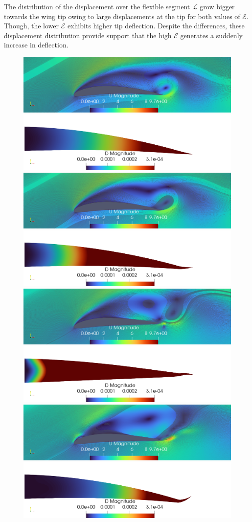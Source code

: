 \documentclass[conf]{new-aiaa}
\begin{document}
%
The distribution of the displacement over the flexible segment $\mathcal{L}$ grow bigger towards the wing tip owing to large displacements at the tip for both values of $\mathcal{E}$.
%
Though, the lower $\mathcal{E}$ exhibits higher tip deflection.
%
Despite the differences, these displacement distribution provide support that the high $\mathcal{E}$ generates a suddenly increase in deflection.
%
\begin{figure}[hbt!]
\centering
\includegraphics[width=0.45\columnwidth]{Figures/streamLines0906Coupling.png}
\includegraphics[width=0.45\columnwidth]{Figures/DMAgnitude0906Coupling.png}
\includegraphics[width=0.45\columnwidth]{Figures/streamLines0918Coupling.png}
\includegraphics[width=0.45\columnwidth]{Figures/DMAgnitude0918Coupling.png}
\includegraphics[width=0.45\columnwidth]{Figures/streamLines0958Coupling.png}
\includegraphics[width=0.45\columnwidth]{Figures/DMAgnitude0958Coupling.png}
\includegraphics[width=0.45\columnwidth]{Figures/streamLines0986Coupling.png}
\includegraphics[width=0.45\columnwidth]{Figures/DMAgnitude0986Coupling.png}

\end{figure}
\end{document}

